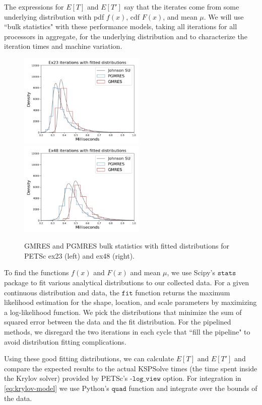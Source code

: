 \documentclass[sigconf, anonymous]{acmart}
\begin{document}
The expressions for $E[T]$ and $E[T']$ say that the iterates come from some underlying  distribution with pdf $f(x)$, cdf $F(x)$, and mean $\mu$. 
We will use ``bulk statistics" with these performance models, taking all iterations for all processors in aggregate, for the underlying distribution and to characterize the iteration times and machine variation. 

\begin{figure}[b]
\centering
\includegraphics[width=6cm]{../plots/GMRES_PGMRES_ex23_8192_1000000_bulk_stats_with_johnsonsu.png}
\includegraphics[width=6cm]{../plots/GMRES_PGMRES_ex48_8192_1000000_bulk_stats_with_johnsonsu.png} 
\caption{GMRES and PGMRES bulk statistics with fitted distributions for PETSc ex23 (left) and ex48 (right).} \label{fig:bulk-fitted}
\end{figure}

To find the functions $f(x)$ and $F(x)$ and mean $\mu$, we use Scipy's ${\texttt{stats}}$ package to fit various analytical distributions to our collected data. For a given continuous distribution and data, the ${\texttt{fit}}$ function returns the maximum likelihood estimation for the shape, location, and scale parameters by maximizing a log-likelihood function.  
We pick the distributions that minimize the sum of squared error between the data and the fit distribution.
For the pipelined methods, we disregard the two iterations in each cycle that ``fill the pipeline" to avoid distribution fitting complications.




Using these good fitting distributions, we can calculate $E[T]$ and $E[T']$ and compare the expected results to the actual KSPSolve times (the time spent inside the Krylov solver) provided by PETSc's ${\texttt{-log\_view}}$ option. 
For integration in \eqref{eq:krylov-model} we use Python's ${\texttt{quad}}$ function and integrate over the bounds of the data.
\end{document}
